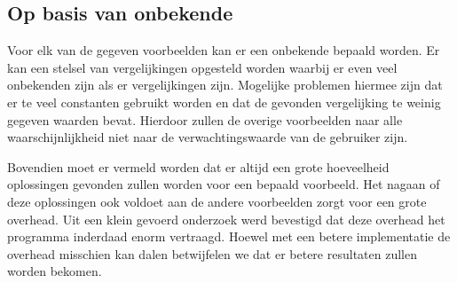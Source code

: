 \documentclass[Main.tex]{subfiles}
\begin{document}
\subsection{Op basis van onbekende}
Voor elk van de gegeven voorbeelden kan er een onbekende bepaald worden. Er kan een stelsel van vergelijkingen opgesteld worden waarbij er even veel onbekenden zijn als er vergelijkingen zijn. Mogelijke problemen hiermee zijn dat er te veel constanten gebruikt worden en dat de gevonden vergelijking te weinig gegeven waarden bevat. Hierdoor zullen de overige voorbeelden naar alle waarschijnlijkheid niet naar de verwachtingswaarde van de gebruiker zijn.\par
 Bovendien moet er vermeld worden dat er altijd een grote hoeveelheid oplossingen gevonden zullen worden voor een bepaald voorbeeld. Het nagaan of deze oplossingen ook voldoet aan de andere voorbeelden zorgt voor een grote overhead. Uit een klein gevoerd onderzoek werd bevestigd dat deze overhead het programma inderdaad enorm vertraagd. Hoewel met een betere implementatie de overhead misschien kan dalen betwijfelen we dat er betere resultaten zullen worden bekomen.
\end{document}
